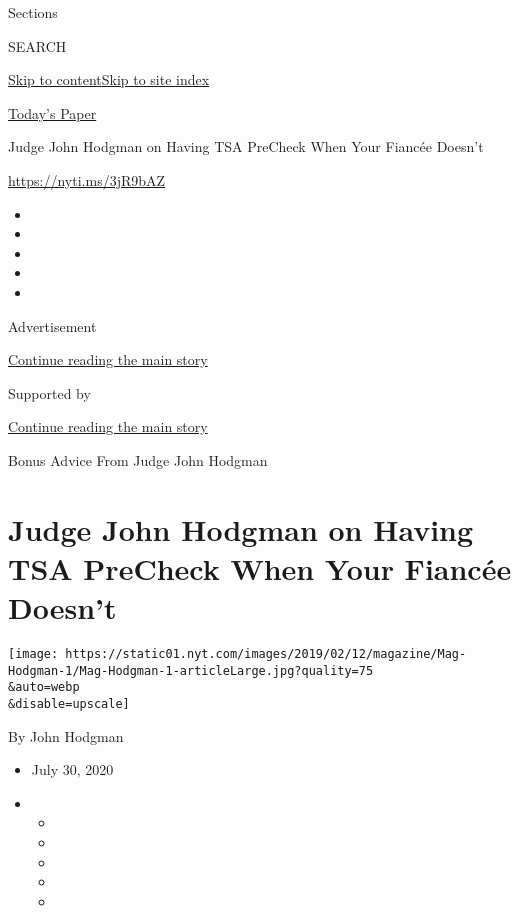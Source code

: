 Sections

SEARCH

\protect\hyperlink{site-content}{Skip to
content}\protect\hyperlink{site-index}{Skip to site index}

\href{https://myaccount.nytimes.com/auth/login?response_type=cookie\&client_id=vi}{}

\href{https://www.nytimes.com/section/todayspaper}{Today's Paper}

Judge John Hodgman on Having TSA PreCheck When Your Fiancée Doesn't

\url{https://nyti.ms/3jR9bAZ}

\begin{itemize}
\item
\item
\item
\item
\item
\end{itemize}

Advertisement

\protect\hyperlink{after-top}{Continue reading the main story}

Supported by

\protect\hyperlink{after-sponsor}{Continue reading the main story}

Bonus Advice From Judge John Hodgman

\hypertarget{judge-john-hodgman-on-having-tsa-precheck-when-your-fiancuxe9e-doesnt}{%
\section{Judge John Hodgman on Having TSA PreCheck When Your Fiancée
Doesn't}\label{judge-john-hodgman-on-having-tsa-precheck-when-your-fiancuxe9e-doesnt}}

\texttt{[image: https://static01.nyt.com/images/2019/02/12/magazine/Mag-Hodgman-1/Mag-Hodgman-1-articleLarge.jpg?quality=75\\\&auto=webp\\\&disable=upscale]}

By John Hodgman

\begin{itemize}
\item
  July 30, 2020
\item
  \begin{itemize}
  \item
  \item
  \item
  \item
  \item
  \end{itemize}
\end{itemize}

